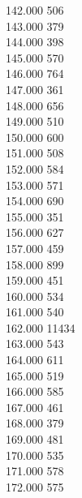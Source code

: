 { 142.000	506 \\
 143.000	379 \\
 144.000	398 \\
 145.000	570 \\
 146.000	764 \\
 147.000	361 \\
 148.000	656 \\
 149.000	510 \\
 150.000	600 \\
 151.000	508 \\
 152.000	584 \\
 153.000	571 \\
 154.000	690 \\
 155.000	351 \\
 156.000	627 \\
 157.000	459 \\
 158.000	899 \\
 159.000	451 \\
 160.000	534 \\
 161.000	540 \\
 162.000	11434 \\
 163.000	543 \\
 164.000	611 \\
 165.000	519 \\
 166.000	585 \\
 167.000	461 \\
 168.000	379 \\
 169.000	481 \\
 170.000	535 \\
 171.000	578 \\
 172.000	575 \\
}
